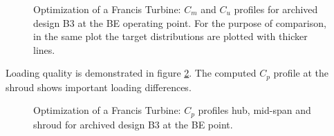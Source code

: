 \begin{figure}[h!]
\begin{minipage}[b]{1\linewidth}
 \centering
\end{minipage}
\caption{Optimization of a Francis Turbine: $C_m$ and $C_u$ profiles for archived design B3 at the BE operating point. For the purpose of comparison, in the same plot the target distributions are plotted with thicker lines.}
\label{Francis-B3-OUT}
\end{figure}

Loading quality is demonstrated in figure \ref{Francis-B3-LOAD}. The computed $C_p$ profile at the shroud shows important loading differences. 

\begin{figure}[h!]
\begin{minipage}[b]{1\linewidth}
 \centering
\end{minipage}
\caption{Optimization of a Francis Turbine: $C_p$ profiles hub, mid-span and shroud for archived design B3 at the BE point.}
\label{Francis-B3-LOAD}
\end{figure}

